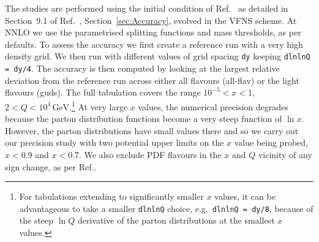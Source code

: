 The studies are performed using the initial condition of
Ref.~\cite{Dittmar:2005ed} as detailed in
%
\ifreleasenote
Section~9.1 of Ref.~\cite{Salam:2008qg},
\else
Section~\ref{sec:Accuracy},
\fi
%
evolved in the VFNS scheme. At NNLO we use the parametrised splitting
functions and mass thresholds, as per \hoppet defaults.
%
To
assess the accuracy we first create a reference run with a very high
density grid. We then run \hoppet{} with different values of grid
spacing \texttt{dy} keeping \texttt{dlnlnQ = dy/4}. The accuracy is
then computed by looking at the largest relative deviation from the
reference run across either all flavours (all-flav) or the light
flavours (guds).
%
The full tabulation covers the range $10^{-5} < x < 1$,
$2 < Q < 10^4\, \text{GeV}$.\footnote{For tabulations extending to
  significantly smaller $x$ values, it can be advantageous to take a
  smaller \texttt{dlnlnQ} choice, e.g.\ \texttt{dlnlnQ = dy/8},
  because of the steep $\ln Q$ derivative of the parton
  distributions at the smallest $x$ values.}
%
At very large $x$ values, the numerical precision degrades because the
parton distribution functions become a very steep function of $\ln
x$.
%
However, the parton distributions have small values there and so we
carry out our precision study with two potential upper limits on the
$x$ value being probed, $x < 0.9$ and $x < 0.7$.
%
We also exclude PDF flavours in the $x$ and $Q$ vicinity of any sign
change, as per Ref.\cite{Salam:2008qg}.

